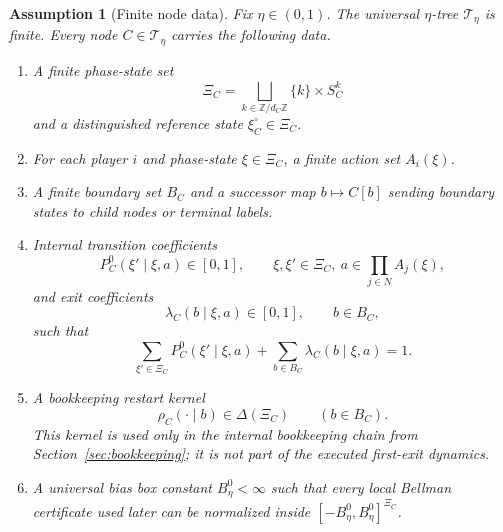 \documentclass[12pt]{article}
\newtheorem{assumption}[theorem]{Assumption}
\theoremstyle{definition}
\newcommand{\1}{\mathbf{1}}
\newcommand{\cT}{\mathcal{T}}
\begin{document}
\begin{assumption}[Finite node data]
\label{ass:node-data}
Fix $\eta\in(0,1)$. The universal $\eta$-tree $\cT_\eta$ is finite. Every node
$C\in \cT_\eta$ carries the following data.
\begin{enumerate}[label=\textnormal{(D\arabic*)},leftmargin=2.8em]
\item A finite phase-state set
\[
\Xi_C=\bigsqcup_{k\in\mathbb Z/d_C\mathbb Z}\{k\}\times S_C^k
\]
and a distinguished reference state $\xi_C^\circ\in\Xi_C$.
\item For each player $i$ and phase-state $\xi\in\Xi_C$, a finite action set
$A_i(\xi)$.
\item A finite boundary set $B_C$ and a successor map $b\mapsto C[b]$ sending
boundary states to child nodes or terminal labels.
\item Internal transition coefficients
\[
P_C^0(\xi'\mid \xi,a)\in[0,1],
\qquad \xi,\xi'\in \Xi_C,
\ a\in \prod_{j\in N}A_j(\xi),
\]
and exit coefficients
\[
\lambda_C(b\mid \xi,a)\in[0,1],
\qquad b\in B_C,
\]
such that
\[
\sum_{\xi'\in\Xi_C}P_C^0(\xi'\mid \xi,a)+\sum_{b\in B_C}\lambda_C(b\mid\xi,a)=1.
\]
\item A bookkeeping restart kernel
\[
\rho_C(\cdot\mid b)\in \Delta(\Xi_C)
\qquad (b\in B_C).
\]
This kernel is used only in the internal bookkeeping chain from
Section~\ref{sec:bookkeeping}; it is not part of the executed first-exit
dynamics.
\item A universal bias box constant $B_\eta^0<\infty$ such that every local
Bellman certificate used later can be normalized inside
$[-B_\eta^0,B_\eta^0]^{\Xi_C}$.
\end{enumerate}
\end{assumption}
\end{document}
